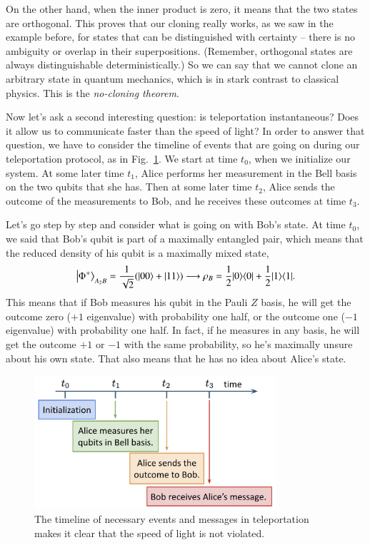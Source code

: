 On the other hand, when the inner product is zero, it means that the two states are orthogonal. This proves that our cloning really works, as we saw in the example before, for states that can be distinguished with certainty -- there is no ambiguity or overlap in their superpositions. (Remember, orthogonal states are always distinguishable deterministically.) So we can say that we cannot clone an arbitrary state in quantum mechanics, which is in stark contrast to classical physics. This is the \emph{no-cloning theorem}.

Now let's ask a second interesting question: is teleportation instantaneous? Does it allow us to communicate faster than the speed of light? In order to answer that question, we have to consider the timeline of events that are going on during our teleportation protocol, as in Fig.~\ref{fig:teleportation-timeline}. We start at time $t_0$, when we initialize our system. At some later time $t_1$, Alice performs her measurement in the Bell basis on the two qubits that she has. Then at some later time $t_2$, Alice sends the outcome of the measurements to Bob, and he receives these outcomes at time $t_3$.

Let's go step by step and consider what is going on with Bob's state. At time $t_0$, we said that Bob's qubit is part of a maximally entangled pair, which means that the reduced density of his qubit is a maximally mixed state,
\begin{equation}
\left|\Phi^{+}\right\rangle_{A_2 B}=\frac{1}{\sqrt{2}}(|00\rangle+|11\rangle) \longrightarrow \rho_B=\frac{1}{2}|0 \rangle \langle 0| +\frac{1}{2}|1 \rangle \langle 1|.
\end{equation}
This means that if Bob measures his qubit in the Pauli $Z$ basis, he will get the outcome zero ($+1$ eigenvalue) with probability one half, or the outcome one ($-1$ eigenvalue) with probability one half. In fact, if he measures in any basis, he will get the outcome $+1$ or $-1$ with the same probability, so he's maximally unsure about his own state. That also means that he has no idea about Alice's state.
\begin{figure}[H]
    \centering
    \includegraphics[width=0.8\textwidth]{lesson8/teleportation-timeline.png}
        \caption{The timeline of necessary events and messages in teleportation makes it clear that the speed of light is not violated.}
    \label{fig:teleportation-timeline}
\end{figure}

